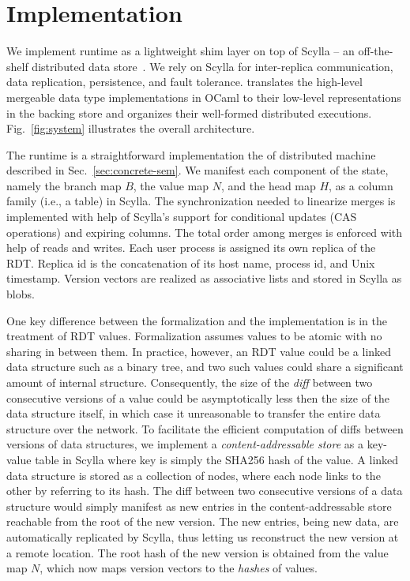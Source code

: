 \section{Implementation}
\label{sec:implementation}

We implement \quark runtime as a lightweight shim layer on top of
Scylla -- an off-the-shelf distributed data store~\cite{scylla}. We
rely on Scylla for inter-replica communication, data replication,
persistence, and fault tolerance. \quark translates the high-level
mergeable data type implementations in OCaml to their low-level
representations in the backing store and organizes their well-formed
distributed executions. Fig.~\ref{fig:system} illustrates the overall
architecture.

The runtime \quark is a straightforward implementation the of
distributed machine \quark described in Sec.~\ref{sec:concrete-sem}.
We manifest each component of the state, namely the branch map $B$,
the value map $N$, and the head map $H$, as a column family (i.e., a
table) in Scylla. The synchronization needed to linearize merges is
implemented with help of Scylla's support for conditional updates (CAS
operations) and expiring columns. The total order among merges is
enforced with help of  reads and writes. Each user process
is assigned its own replica of the RDT.  Replica id is the
concatenation of its host name, process id, and Unix timestamp.
Version vectors are realized as associative lists and stored in Scylla
as blobs.

One key difference between the formalization and the implementation is
in the treatment of RDT values. Formalization assumes values to be
atomic with no sharing in between them. In practice, however, an RDT
value could be a linked data structure such as a binary tree, and two
such values could share a significant amount of internal structure.
Consequently, the size of the \emph{diff} between two consecutive
versions of a value could be asymptotically less then the size of the
data structure itself, in which case it unreasonable to transfer the
entire data structure over the network. To facilitate the efficient
computation of diffs between versions of data structures, we implement
a \emph{content-addressable store} as a key-value table in Scylla
where key is simply the SHA256 hash of the value. A linked data
structure is stored as a collection of nodes, where each node links to
the other by referring to its hash. The diff between two consecutive
versions of a data structure would simply manifest as new entries in
the content-addressable store reachable from the root of the new
version. The new entries, being new data, are automatically replicated
by Scylla, thus letting us reconstruct the new version at a remote
location. The root hash of the new version is obtained from the value
map $N$, which now maps version vectors to the \emph{hashes} of
values.
